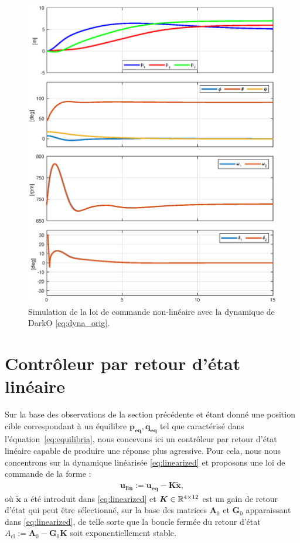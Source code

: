 \begin{figure}[ht!]
    \centering
    \includegraphics[trim=0cm 0.6cm 0cm 0.6cm,clip,width=0.8\columnwidth]{figures/global2.eps}
    \caption{Simulation de la loi de commande non-linéaire avec la dynamique de DarkO \eqref{eq:dyna_orig}.}
    \label{fig_global_contol}
\end{figure}


\section{Contrôleur par retour d'état linéaire}
Sur la base des observations de la section précédente et étant donné une position cible correspondant à un équilibre $\boldsymbol{p_{\text{eq}}}, \boldsymbol{q_{\text{eq}}}$ tel que caractérisé dans l'équation~\ref{eq:equilibria}, nous concevons ici un contrôleur par retour d'état linéaire capable de produire une réponse plus agressive. Pour cela, nous nous concentrons sur la dynamique linéarisée \eqref{eq:linearized} et proposons une loi de commande de la forme :
\begin{align}
  \boldsymbol{u_{\text{lin}}} := \boldsymbol{u_{\text{eq}}} - \boldsymbol{K} \boldsymbol{\tilde x},
\label{eq:u_lin}
\end{align}
où $\boldsymbol{\tilde x}$ a été introduit dans \eqref{eq:linearized} et $\boldsymbol{K} \in {\mathbb R}^{4 \times 12}$ est un gain de retour d'état qui peut être sélectionné, sur la base des matrices $\boldsymbol{A}_{0}$ et $\boldsymbol{G}_{0}$ apparaissant dans \eqref{eq:linearized}, de telle sorte que la boucle fermée du retour d'état $A_{\text{cl}}:=\boldsymbol{A}_{0}-\boldsymbol{G}_{0}\boldsymbol{K}$ soit exponentiellement stable. 

